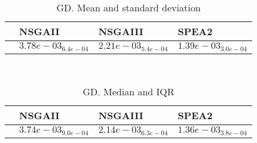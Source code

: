 \documentclass{article}
\begin{document}
\
\begin{table}
\caption{GD. Mean and standard deviation}
\label{table:mean.GD}
\centering
\begin{scriptsize}
\begin{tabular}{llll}
\hline & NSGAII & NSGAIII &  SPEA2\\
\hline
 & $  3.78e-03_{ 6.4e-04}$ & \cellcolor{gray25}$  2.21e-03_{ 5.4e-04}$ & \cellcolor{gray95}$  1.39e-03_{ 3.0e-04}$ \\
\hline
\end{tabular}
\end{scriptsize}
\end{table}
\
\begin{table}
\caption{GD. Median and IQR}
\label{table:median.GD}
\begin{scriptsize}
\centering
\begin{tabular}{llll}
\hline & NSGAII & NSGAIII &  SPEA2\\
\hline
 & $  3.74e-03_{ 9.0e-04}$ & \cellcolor{gray25}$  2.14e-03_{ 6.3e-04}$ & \cellcolor{gray95}$  1.36e-03_{ 3.8e-04}$ \\
\hline
\end{tabular}
\end{scriptsize}
\end{table}
\end{document}
